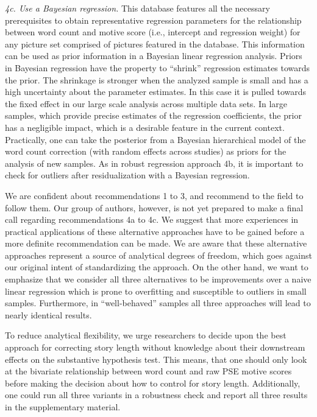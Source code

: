 \documentclass[jou,a4paper]{apa6}\usepackage[]{graphicx}\usepackage[]{color}
\begin{document}
\emph{4c. Use a Bayesian regression.} This database features all the necessary prerequisites to obtain representative regression parameters for the relationship between word count and motive score (i.e., intercept and regression weight) for any picture set comprised of pictures featured in the database. This information can be used as prior information in a Bayesian linear regression analysis. Priors in Bayesian regression have the property to ``shrink'' regression estimates towards the prior. The shrinkage is stronger when the analyzed sample is small and has a high uncertainty about the parameter estimates. In this case it is pulled towards the fixed effect in our large scale analysis across multiple data sets. In large samples, which provide precise estimates of the regression coefficients, the prior has a negligible impact, which is a desirable feature in the current context. 
Practically, one can take the posterior from a Bayesian hierarchical model of the word count correction (with random effects across studies) as priors for the analysis of new samples. 
As in robust regression approach 4b, it is important to check for outliers after residualization with a Bayesian regression.


We are confident about recommendations 1 to 3, and recommend to the field to follow them. Our group of authors, however, is not yet prepared to make a final call regarding recommendations 4a to 4c. We suggest that more experiences in practical applications of these alternative approaches have to be gained before a more definite recommendation can be made. We are aware that these alternative approaches represent a source of analytical degrees of freedom, which goes against our original intent of standardizing the approach. On the other hand, we want to emphasize that we consider all three alternatives to be improvements over a naive linear regression which is prone to overfitting and susceptible to outliers in small samples. Furthermore, in ``well-behaved'' samples all three approaches will lead to nearly identical results.

To reduce analytical flexibility, we urge researchers to decide upon the best approach for correcting story length without knowledge about their downstream effects on the substantive hypothesis test. This means, that one should only look at the bivariate relationship between word count and raw PSE motive scores before making the decision about how to control for story length. Additionally, one could run all three variants in a robustness check and report all three results in the supplementary material.
\end{document}
